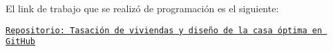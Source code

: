 El link de trabajo que se realizó de programación es el siguiente:

\href{https://github.com/JosefaATP/Optimizacion-Casas-Ames-Iowa-Capstone-/tree/XGBoost-%2B-Remodelaci%C3%B3n}{\texttt{Repositorio: Tasación de
viviendas y diseño de la casa óptima en GitHub}}
